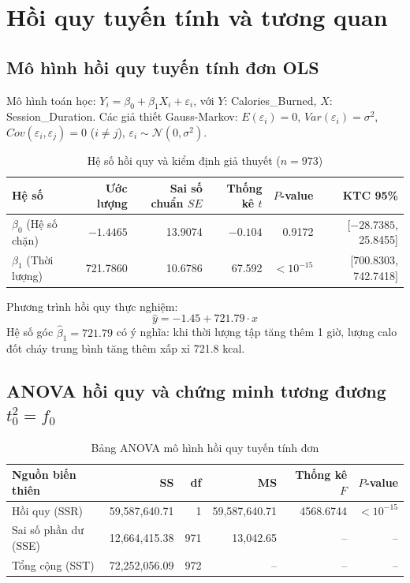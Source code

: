 \documentclass[12pt,a4paper]{report}
\begin{document}
\chapter{Hồi quy tuyến tính và tương quan}
\section{Mô hình hồi quy tuyến tính đơn OLS}
Mô hình toán học: $Y_i = \beta_0 + \beta_1 X_i + \varepsilon_i$, với $Y$: Calories\_Burned, $X$: Session\_Duration.
Các giả thiết Gauss-Markov: $E(\varepsilon_i) = 0$, $Var(\varepsilon_i) = \sigma^2$, $Cov(\varepsilon_i, \varepsilon_j) = 0$ ($i \ne j$), $\varepsilon_i \sim \mathcal{N}(0, \sigma^2)$.

\begin{table}[htbp]
\centering\small
\caption{Hệ số hồi quy và kiểm định giả thuyết ($n = 973$)}
\begin{tabular}{lrrrrr}
\toprule
\textbf{Hệ số} & \textbf{Ước lượng} & \textbf{Sai số chuẩn $SE$} & \textbf{Thống kê $t$} & \textbf{$P$-value} & \textbf{KTC 95\%} \\
\midrule
$\beta_0$ (Hệ số chặn) & $-1.4465$ & 13.9074 & $-0.104$ & 0.9172 & [$-28.7385$, 25.8455] \\
$\beta_1$ (Thời lượng) & 721.7860 & 10.6786 & 67.592 & $< 10^{-15}$ & [700.8303, 742.7418] \\
\bottomrule
\end{tabular}
\end{table}

Phương trình hồi quy thực nghiệm:
\[ \hat{y} = -1.45 + 721.79 \cdot x \]
Hệ số góc $\hat{\beta}_1 = 721.79$ có ý nghĩa: khi thời lượng tập tăng thêm 1 giờ, lượng calo đốt cháy trung bình tăng thêm xấp xỉ 721.8 kcal.

\section{ANOVA hồi quy và chứng minh tương đương $t_0^2 = f_0$}
\begin{table}[htbp]
\centering\small
\caption{Bảng ANOVA mô hình hồi quy tuyến tính đơn}
\begin{tabular}{lrrrrr}
\toprule
\textbf{Nguồn biến thiên} & \textbf{SS} & \textbf{df} & \textbf{MS} & \textbf{Thống kê $F$} & \textbf{$P$-value} \\
\midrule
Hồi quy (SSR) & 59,587,640.71 & 1 & 59,587,640.71 & 4568.6744 & $< 10^{-15}$ \\
Sai số phần dư (SSE) & 12,664,415.38 & 971 & 13,042.65 & -- & -- \\
Tổng cộng (SST) & 72,252,056.09 & 972 & -- & -- & -- \\
\bottomrule
\end{tabular}
\end{table}
\end{document}
